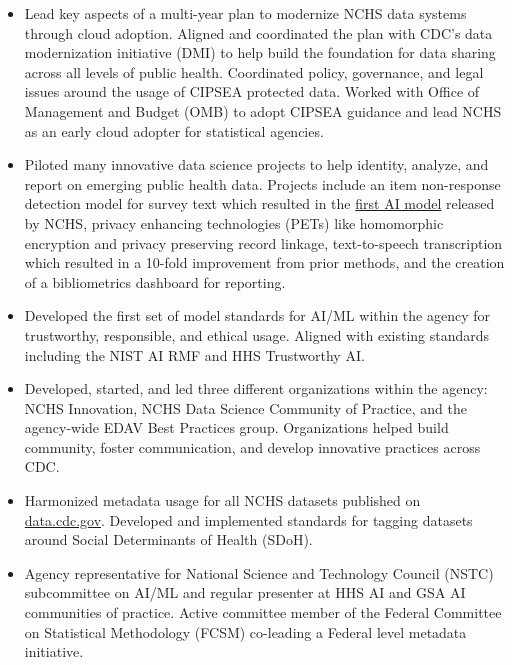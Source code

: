 \documentclass[]{scrartcl}
\begin{document}
\begin{cleanCV}
{\begin{itemize}
  \item Lead key aspects of a multi-year plan to modernize NCHS data systems through cloud adoption. Aligned and coordinated the plan with CDC's data modernization initiative (DMI) to help build the foundation for data sharing across all levels of public health. Coordinated policy, governance, and legal issues around the usage of CIPSEA protected data. Worked with Office of Management and Budget (OMB) to adopt CIPSEA guidance and lead NCHS as an early cloud adopter for statistical agencies.
    
        \item Piloted many innovative data science projects to help identity, analyze, and report on emerging public health data. Projects include an item non-response detection model for survey text which resulted in the \href{https://www.cdc.gov/nchs/data-science/SANDS-model-context.htm}{first AI model} released by NCHS, privacy enhancing technologies (PETs) like homomorphic encryption and privacy preserving record linkage, text-to-speech transcription which resulted in a 10-fold improvement from prior methods, and the creation of a bibliometrics dashboard for reporting.
    
  \item Developed the first set of model standards for AI/ML within the agency for trustworthy, responsible, and ethical usage. Aligned with existing standards including the NIST AI RMF and HHS Trustworthy AI.
    
  \item Developed, started, and led three different organizations within the agency: NCHS Innovation, NCHS Data Science Community of Practice, and the agency-wide EDAV Best Practices group. Organizations helped build community, foster communication, and develop innovative practices across CDC.

  \item Harmonized metadata usage for all NCHS datasets published on \href{https://data.cdc.gov/browse?category=NCHS}{data.cdc.gov}. Developed and implemented standards for tagging datasets around Social Determinants of Health (SDoH).
    
      \item Agency representative for National Science and Technology Council (NSTC) subcommittee on AI/ML and regular presenter at HHS AI and GSA AI communities of practice. Active committee member of the Federal Committee on Statistical Methodology (FCSM) co-leading a Federal level metadata initiative.


\end{itemize}}
\end{cleanCV}
\end{document}
